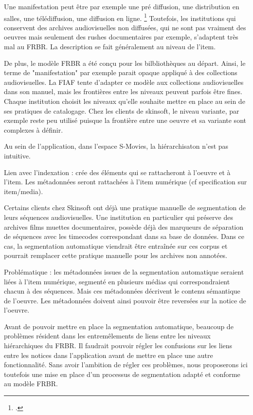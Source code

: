 

Une manifestation peut être par exemple une pré diffusion, une distribution en salles, une télédiffusion, une diffusion en ligne. \footcite{zotero-item-646}
Toutefois, les institutions qui conservent des archives audiovisuelles non diffusées, qui ne sont pas vraiment des oeuvres mais seulement des rushes documentaires par exemple, s'adaptent très mal au FRBR. La description se fait généralement au niveau de l'item. 

De plus, le modèle FRBR a été conçu pour les bilbliothèques au départ. Ainsi, le terme de "manifestation" par exemple parait opaque appliqué à des collections audiovisuelles. La FIAF tente d'adapter ce modèle aux collections audiovisuelles dans son manuel, mais les frontières entre les niveaux peuvent parfois être fines. Chaque institution choisit les niveaux qu'elle souhaite mettre en place au sein de ses pratiques de catalogage. Chez les clients de skinsoft, le niveau variante, par exemple reste peu utilisé puisque la frontière entre une oeuvre et sa variante sont complexes à définir. 

Au sein de l'application, dans l'espace S-Movies, la hiérarchisaton n'est pas intuitive. 

Lien avec l'indexation : crée des éléments qui se rattacheront à l'oeuvre et à l'item. 
Les métadonnées seront rattachées à l'item numérique (cf specification sur item/media).

Certains clients chez Skinsoft ont déjà une pratique manuelle de segmentation de leurs séquences audiovisuelles. Une institution en particulier qui préserve des archives films muettes documentaires, possède déjà des marqueurs de séparation de séquences avec les timecodes correspondant dans sa base de données. Dans ce cas, la segmentation automatique viendrait être entraînée sur ces corpus et pourrait remplacer cette pratique manuelle pour les archives non annotées. 

Problématique : les métadonnées issues de la segmentation automatique seraient liées à l'item numérique, segmenté en plusieurs médias qui correspondraient chacun à des séquences. Mais ces métadonnées décrivent le contenu sémantique de l'oeuvre. Les métadonnées doivent ainsi pouvoir être reversées sur la notice de l'oeuvre. 

Avant de pouvoir mettre en place la segmentation automatique, beaucoup de problèmes résident dans les entremêlements de liens entre les niveaux hiérarchiques du FRBR. Il faudrait pouvoir régler les confusions sur les liens entre les notices dans l'application avant de mettre en place une autre fonctionnalité. Sans avoir l'ambition de régler ces problèmes, nous proposerons ici toutefois une mise en place d'un processus de segmentation adapté et conforme au modèle FRBR. 


